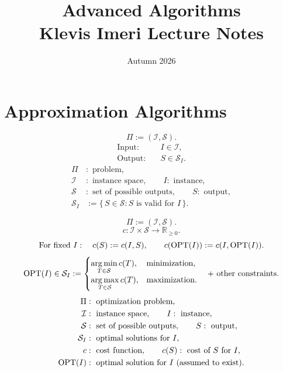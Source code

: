 \documentclass[12pt,a4paper]{article}
\title{Advanced Algorithms\\\large Klevis Imeri Lecture Notes}
\author{}
\date{Autumn 2026}
\begin{document}
\maketitle
\tableofcontents

\section{Approximation Algorithms}

\begin{definition}[Problem]
\[
\Pi:=(\mathcal I,\mathcal S).
\]
\[
\begin{aligned}
\text{Input:}\quad&I\in\mathcal I,\\
\text{Output:}\quad&S\in\mathcal S_I.
\end{aligned}
\]
\[
\begin{aligned}
\Pi&:\text{ problem},\\
\mathcal I&:\text{ instance space},\qquad I:\text{ instance},\\
\mathcal S&:\text{ set of possible outputs},\qquad S:\text{ output},\\
\mathcal S_I&:=\{\,S\in\mathcal S:S\text{ is valid for }I\,\}.
\end{aligned}
\]
\end{definition}

\noindent\begin{minipage}{\linewidth}
\begin{definition}
\[
\Pi:=(\mathcal I,\mathcal S).
\]
\[
c:\mathcal I\times\mathcal S\to\mathbb R_{\geq0}.
\]
\[
\text{For fixed }I:\quad c(S):=c(I,S),\qquad c(\operatorname{OPT}(I)):=c(I,\operatorname{OPT}(I)).
\]
\[
\operatorname{OPT}(I)\in\mathcal S_I:=
\begin{cases}
\displaystyle\operatorname*{arg\,min}_{T\in\mathcal S}c(T), & \text{minimization},\\[0.6em]
\displaystyle\operatorname*{arg\,max}_{T\in\mathcal S}c(T), & \text{maximization}.
\end{cases}
\quad\text{+ other constraints}.
\]
\[
\begin{aligned}
\Pi&:\text{ optimization problem},\\
\mathcal I&:\text{ instance space},\qquad I:\text{ instance},\\
\mathcal S&:\text{ set of possible outputs},\qquad S:\text{ output},\\
\mathcal S_I&:\text{ optimal solutions for }I,\\
c&:\text{ cost function},\qquad c(S):\text{ cost of }S\text{ for }I,\\
\operatorname{OPT}(I)&:\text{ optimal solution for }I\text{ (assumed to exist)}.
\end{aligned}
\]
\end{definition}
\end{minipage}\par
\end{document}
